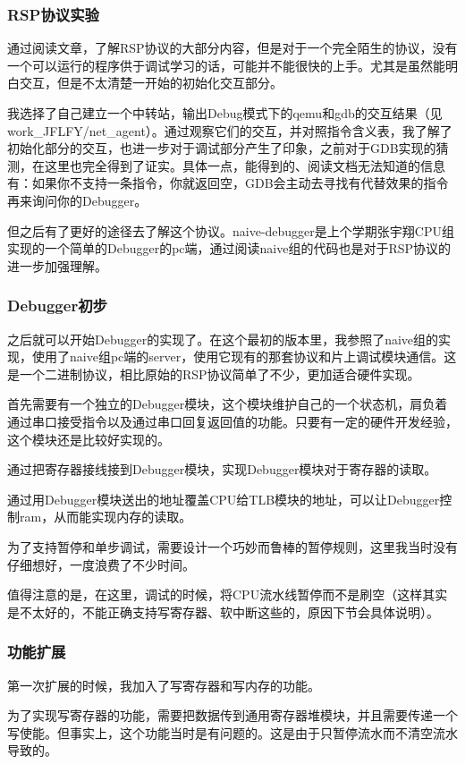 \subsubsection{RSP协议实验}
通过阅读文章，了解RSP协议的大部分内容，但是对于一个完全陌生的协议，没有一个可以运行的程序供于调试学习的话，可能并不能很快的上手。尤其是虽然能明白交互，但是不太清楚一开始的初始化交互部分。

我选择了自己建立一个中转站，输出Debug模式下的qemu和gdb的交互结果（见work\_JFLFY/net\_agent）。通过观察它们的交互，并对照指令含义表，我了解了初始化部分的交互，也进一步对于调试部分产生了印象，之前对于GDB实现的猜测，在这里也完全得到了证实。具体一点，能得到的、阅读文档无法知道的信息有：如果你不支持一条指令，你就返回空，GDB会主动去寻找有代替效果的指令再来询问你的Debugger。

但之后有了更好的途径去了解这个协议。naive-debugger是上个学期张宇翔CPU组实现的一个简单的Debugger的pc端，通过阅读naive组的代码也是对于RSP协议的进一步加强理解。

\subsubsection{Debugger初步}
之后就可以开始Debugger的实现了。在这个最初的版本里，我参照了naive组的实现，使用了naive组pc端的server，使用它现有的那套协议和片上调试模块通信。这是一个二进制协议，相比原始的RSP协议简单了不少，更加适合硬件实现。

首先需要有一个独立的Debugger模块，这个模块维护自己的一个状态机，肩负着通过串口接受指令以及通过串口回复返回值的功能。只要有一定的硬件开发经验，这个模块还是比较好实现的。

通过把寄存器接线接到Debugger模块，实现Debugger模块对于寄存器的读取。

通过用Debugger模块送出的地址覆盖CPU给TLB模块的地址，可以让Debugger控制ram，从而能实现内存的读取。

为了支持暂停和单步调试，需要设计一个巧妙而鲁棒的暂停规则，这里我当时没有仔细想好，一度浪费了不少时间。

值得注意的是，在这里，调试的时候，将CPU流水线暂停而不是刷空（这样其实是不太好的，不能正确支持写寄存器、软中断这些的，原因下节会具体说明）。

\subsubsection{功能扩展}
第一次扩展的时候，我加入了写寄存器和写内存的功能。

为了实现写寄存器的功能，需要把数据传到通用寄存器堆模块，并且需要传递一个写使能。但事实上，这个功能当时是有问题的。这是由于只暂停流水而不清空流水导致的。


